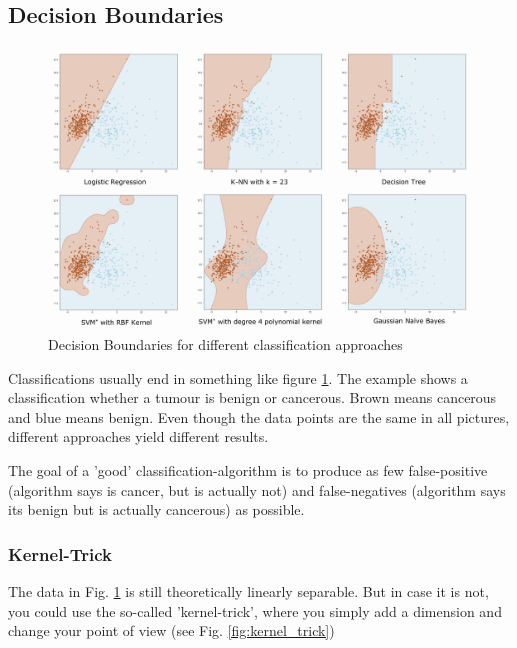 \documentclass[11pt]{article}
\begin{document}
\subsection{Decision Boundaries}

\begin{figure}[htb!]
    \centering
    \includegraphics[keepaspectratio=true, width=\linewidth]{decision_boundaries.png}
    \caption{Decision Boundaries for different classification approaches}
    \label{fig:decision_boundaries}
\end{figure}

Classifications usually end in something like figure \ref{fig:decision_boundaries}. The example shows a classification whether a tumour is benign or cancerous. Brown means cancerous and blue means benign. Even though the data points are the same in all pictures, different approaches yield different results.

The goal of a 'good' classification-algorithm is to produce as few false-positive (algorithm says is cancer, but is actually not) and false-negatives (algorithm says its benign but is actually cancerous) as possible.

\subsubsection{Kernel-Trick}
The data in Fig. \ref{fig:decision_boundaries} is still theoretically linearly separable. But in case it is not, you could use the so-called 'kernel-trick', where you simply add a dimension and change your point of view (see Fig. \ref{fig:kernel_trick})
\end{document}

